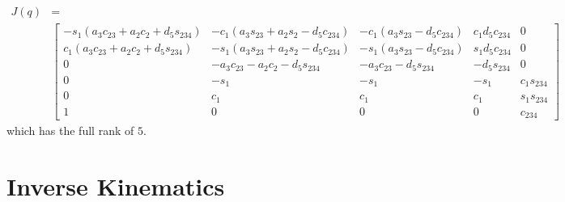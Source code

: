 \begin{align*}
    J(q) &= \\
    &\begin{bmatrix}
        -s_1(a_3c_{23} + a_2c_{2} + d_5s_{234}) & 
        -c_1(a_3s_{23} + a_2s_{2} - d_5c_{234}) & 
        -c_1(a_3s_{23} - d_5c_{234})            & 
        c_1d_5c_{234}                           & 
        0\\
        c_1(a_3c_{23} + a_2c_{2} + d_5s_{234})  & 
        -s_1(a_3s_{23} + a_2s_{2} - d_5c_{234}) & 
        -s_1(a_3s_{23} - d_5c_{234})            & 
        s_1d_5c_{234}                           & 
        0\\
        0                                       &
        -a_3c_{23}- a_2c_2 - d_5s_{234}         &
        -a_3c_{23} - d_5s_{234}                 &
        -d_5s_{234}                             &
        0\\
        0                                       &
        -s_1                                    &
        -s_1                                    &
        -s_1                                    &
        c_1s_{234}\\
        0                                       &
        c_1&
        c_1&
        c_1&
        s_1s_{234}\\
        1& 0 & 0 & 0 & c_{234}
    \end{bmatrix}
\end{align*}
which has the full rank of $5$. 

















\section{Inverse Kinematics}

